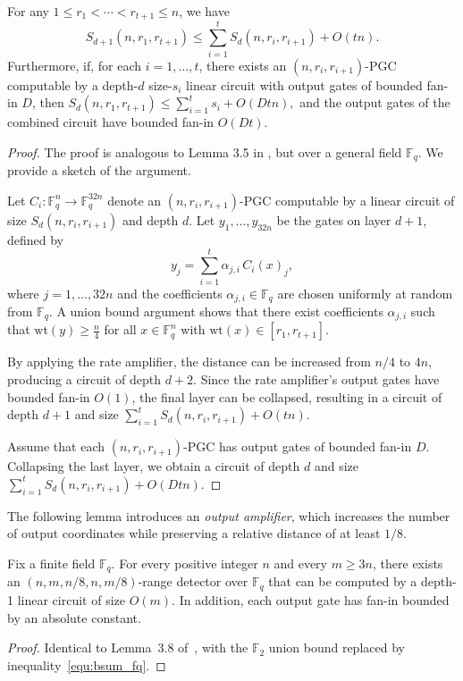 \documentclass[11pt]{article}
\newcommand{\weight}{\mathrm{wt}}
\theoremstyle{named}
\begin{document}
\begin{lemma} 
\label{lem:composition}
For any $1 \le r_1 < \cdots < r_{t+1} \le n$, we have
\[
S_{d+1}(n, r_1, r_{t+1}) \le \sum_{i=1}^t S_d(n, r_i, r_{i+1}) + O(tn).
\]Furthermore, if, for each $i = 1, \ldots, t$, there exists an $(n, r_i, r_{i+1})$-PGC computable by a depth-$d$ size-$s_i$ linear circuit with output gates of bounded fan-in $D$, then
$
S_d(n, r_1, r_{t+1}) \le \sum_{i=1}^t s_i + O(D t n),
$
and the output gates of the combined circuit have bounded fan-in $O(Dt)$.
\end{lemma}
\begin{proof}
The proof is analogous to Lemma 3.5 in \cite{drucker2023minimum}, but over a general field $\mathbb{F}_q$. We provide a sketch of the argument.

Let $C_i:\mathbb{F}_q^n \to \mathbb{F}_q^{32n}$ denote an $(n, r_i, r_{i+1})$-PGC computable by a linear circuit of size $S_d(n, r_i, r_{i+1})$ and depth $d$. Let $y_1, \ldots, y_{32n}$ be the gates on layer $d+1$, defined by
\[
y_j = \sum_{i=1}^t \alpha_{j,i} \, C_i(x)_j,
\]
where $j = 1, \ldots, 32n$ and the coefficients $\alpha_{j,i} \in \mathbb{F}_q$ are chosen uniformly at random from $\mathbb{F}_q$. A union bound argument shows that there exist coefficients $\alpha_{j,i}$ such that $\mathrm{wt}(y) \ge \frac{n}{4}$ for all $x \in \mathbb{F}_q^n$ with $\weight(x) \in [r_1, r_{t+1}]$.

By applying the rate amplifier, the distance can be increased from $n/4$ to $4n$, producing a circuit of depth $d+2$. Since the rate amplifier's output gates have bounded fan-in $O(1)$, the final layer can be collapsed, resulting in a circuit of depth $d+1$ and size $\sum_{i=1}^t S_d(n, r_i, r_{i+1}) + O(t n).$

Assume that each $(n, r_i, r_{i+1})$-PGC has output gates of bounded fan-in $D$. Collapsing the last layer, we obtain a circuit of depth $d$ and size $\sum_{i=1}^t S_d(n, r_i, r_{i+1}) + O(Dtn)$.
\end{proof}


The following lemma introduces an \emph{output amplifier}, which increases 
the number of output coordinates while preserving a relative distance of 
at least $1/8$.

\begin{lemma}  
\label{lem:output_amplifier}
Fix a finite field $\mathbb{F}_q$. For every positive integer $n$ and every $m \ge 3n$, there exists an 
$(n, m, n/8, n, m/8)$-range detector over $\mathbb{F}_q$ that can be computed by a depth-1 
linear circuit of size $O(m)$. In addition, each output gate has fan-in bounded by an absolute constant.
\end{lemma}
\begin{proof}
Identical to Lemma~3.8 of~\cite{drucker2023minimum}, with the $\mathbb{F}_2$ 
union bound replaced by inequality~\eqref{equ:bsum_fq}.
\end{proof}
\end{document}
